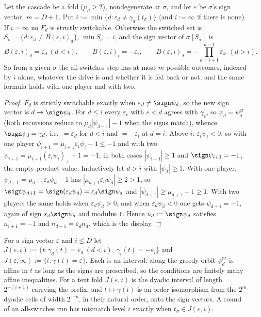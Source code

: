 \begin{theorem}\label{thm:ff-bmap}
Let the cascade be a fold ($\mu_d\ge2$), nondegenerate at $\sigma$, and let
$\varepsilon$ be $\sigma$'s sign vector, $m=D+1$. Put
$i:=\min\{d:\varepsilon_d\ne\gamma_d(t_\sigma)\}$ (and $i:=\infty$ if there is
none). If $i=\infty$ no $F_d$ is strictly switchable. Otherwise the switched
set is $S_\sigma=\{d:\varepsilon_d\ne B(\varepsilon,i)_d\}$, $\min S_\sigma=i$,
and the sign vector of $\sigma[S_\sigma]$ is
\[
  B(\varepsilon,i)_d=\varepsilon_d\ (d<i),\qquad
  B(\varepsilon,i)_i=-\varepsilon_i,\qquad
  B(\varepsilon,i)_d=-\!\!\prod_{k=i+1}^{d-1}\!\!\varepsilon_k\ \ (d>i).
\]
So from a given $\sigma$ the all-switches step has at most $m$ possible
outcomes, indexed by $i$ alone, whatever the drive is and whether it is fed
back or not; and the same formula holds with one player and with two.
\end{theorem}

\begin{proof}
$F_d$ is strictly switchable exactly when $\varepsilon_d\ne\sign\psi_d$, so the
new sign vector is $d\mapsto\sign\psi_d$. For $d\le i$ every $\varepsilon_e$
with $e<d$ agrees with $\gamma_e$, so $\psi_d=\psi^{\mathrm{gr}}_d$ (both
recursions reduce to $\mu_d|\psi_{d-1}|-1$ when the signs match), whence
$\sign\psi_d=\gamma_d$, i.e.\ $=\varepsilon_d$ for $d<i$ and $=-\varepsilon_i$
at $d=i$. Above $i$: $\varepsilon_i\psi_i<0$, so with one player
$\psi_{i+1}=\mu_{i+1}\varepsilon_i\psi_i-1\le-1$ and with two
$\psi_{i+1}=\mu_{i+1}(\varepsilon_i\psi_i)_+-1=-1$; in both cases
$|\psi_{i+1}|\ge1$ and $\sign\psi_{i+1}=-1$, the empty-product value.
Inductively let $d>i$ with $|\psi_d|\ge1$. With one player,
$\psi_{d+1}=\mu_{d+1}\varepsilon_d\psi_d-1$ has
$|\mu_{d+1}\varepsilon_d\psi_d|\ge2>1$, so $\sign\psi_{d+1}=\sign(\varepsilon_d\psi_d)
=\varepsilon_d\sign\psi_d$ and $|\psi_{d+1}|\ge\mu_{d+1}-1\ge1$. With two
players the same holds when $\varepsilon_d\psi_d>0$, and when
$\varepsilon_d\psi_d<0$ one gets $\psi_{d+1}=-1$, again of sign
$\varepsilon_d\sign\psi_d$ and modulus $1$. Hence $n_d:=\sign\psi_d$ satisfies
$n_{i+1}=-1$ and $n_{d+1}=\varepsilon_dn_d$, which is the display.
\end{proof}

\begin{lemma}\label{lem:ff-cell}
For a sign vector $\varepsilon$ and $i\le D$ let
$J(\varepsilon,i):=\{t:\gamma_d(t)=\varepsilon_d\ (d<i),\ \gamma_i(t)=-\varepsilon_i\}$
and $J(\varepsilon,\infty):=\{t:\gamma(t)=\varepsilon\}$. Each is an interval:
along the greedy orbit $\psi^{\mathrm{gr}}_d$ is affine in $t$ as long as the
signs are prescribed, so the conditions are finitely many affine inequalities.
For a tent fold $J(\varepsilon,i)$ is the dyadic interval of length
$2^{-(i+1)}$ carrying the prefix, and $t\mapsto\gamma(t)$ is an order
isomorphism from the $2^{m}$ dyadic cells of width $2^{-m}$, in their natural
order, onto the sign vectors. A round of an all-switches run has mismatch level
$i$ exactly when $t_\sigma\in J(\varepsilon,i)$.
\end{lemma}

